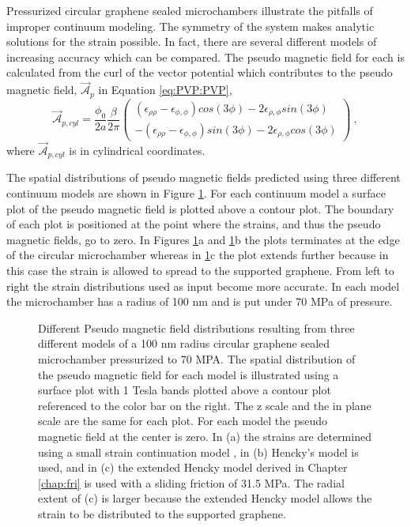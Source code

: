 Pressurized circular graphene sealed microchambers illustrate the pitfalls of improper continuum modeling.
The symmetry of the system makes analytic solutions for the strain possible.
In fact, there are several different models of increasing accuracy which can be compared.
The pseudo magnetic field for each is calculated from the curl of the vector potential which contributes to the pseudo magnetic field, $\vec{\mathcal{A}}_p$ in Equation \ref{eq:PVP:PVP}, 
\begin{equation*}
\vec{\mathcal{A}}_{p,cyl}=\frac{\phi_0}{2a} \frac{\beta}{2 \pi}
  \left( \begin{array}{c}
    (\epsilon_{\rho\rho}-\epsilon_{\phi,\phi}) cos(3\phi)-2 \epsilon_{\rho,\phi} sin (3 \phi) \\
    -(\epsilon_{\rho\rho}-\epsilon_{\phi,\phi}) sin(3\phi)-2 \epsilon_{\rho,\phi} cos (3 \phi)
  \end{array} \right) \ ,
\end{equation*}
where $\vec{\mathcal{A}}_{p,cyl}$ is in cylindrical coordinates.

The spatial distributions of pseudo magnetic fields predicted using three different continuum models are shown in Figure \ref{fig:PVP:circle}.
For each continuum model a surface plot of the pseudo magnetic field is plotted above a contour plot.
The boundary of each plot is positioned at the point where the strains, and thus the pseudo magnetic fields, go to zero.
In Figures \ref{fig:PVP:circle}a and \ref{fig:PVP:circle}b the plots terminates at the edge of the circular microchamber whereas in \ref{fig:PVP:circle}c the plot extends further because in this case the strain is allowed to spread to the supported graphene.
From left to right the strain distributions used as input become more accurate.
In each model the microchamber has a radius of 100 nm and is put under 70 MPa of pressure.

\begin{figure}
  \begin{center}
  
  \end{center}
  \caption[Different pseudo magnetic field distributions resulting from three different models]{\label{fig:PVP:circle} Different Pseudo magnetic field distributions resulting from three different models of a 100 nm radius circular graphene sealed microchamber pressurized to 70 MPA. The spatial distribution of the pseudo magnetic field for each model is illustrated using a surface plot with 1 Tesla bands plotted above a contour plot referenced to the color bar on the right. The z scale and the in plane scale are the same for each plot.  For each model the pseudo magnetic field at the center is zero. In (a) the strains are determined using a small strain continuation model \cite{Timoshenko}, in (b) Hencky's model \cite{Hencky1915} is used, and in (c) the extended Hencky model derived in Chapter \ref{chap:fri} is used with a sliding friction of 31.5 MPa.  The radial extent of (c) is larger because the extended Hencky model allows the strain to be distributed to the supported graphene.}
\end{figure}

